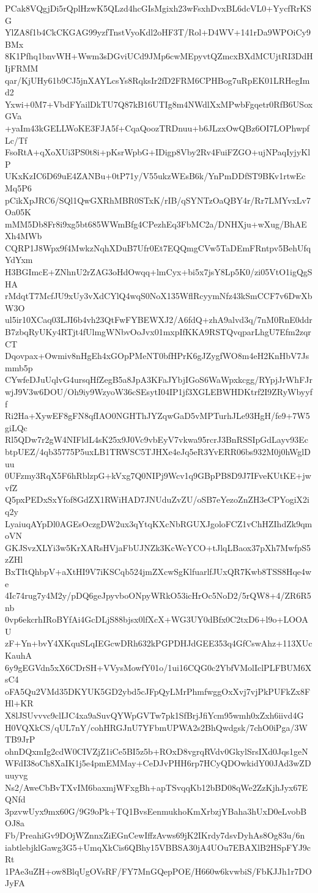 PCak8VQgjDi5rQplHzwK5QLzd4hcGIsMgixh23wFsxhDvxBL6dcVL0+YycfRrKSG
YlZA8f1b4CkCKGAG99yzfTnstVyoKdl2oHF3T/Rol+D4WV+141rDa9WPOiCy9BMx
8K1Pfhq1bnvWH+Wwm3sDGviUCd9JMp6cwMEpyvtQZmcxBXdMCUjtRI3DdHIjFRMM
qar/KjUHy61b9CJ5jnXAYLcsYs8RqksIr2fD2FRM6CPHBog7uRpEK01LRHegImd2
Yxwi+0M7+VbdFYailDkTU7Q87kB16UTIg8m4NWdlXxMPwbFgqetr0RfB6USoxGVa
+yaIm43kGELLWoKE3FJA5f+CqaQoozTRDnuu+b6JLzxOwQBz6OI7LOPhwpfLc/Tf
FsoRtA+qXoXUi3PS0t8i+pKsrWpbG+IDigp8Vby2Rv4FuiFZGO+ujNPaqIyjyKlP
UKxKzIC6D69uE4ZANBu+0tP71y/V55ukzWEsB6k/YnPmDDfST9BKv1rtwEcMq5P6
pCikXpJRC6/SQl1QwGXRhMBR0STxK/rIB/qSYNTzOaQBY4r/Rr7LMYvxLv7Oa05K
mMM5Db8Fr8i9xg5bt685WWmBfg4CPezhEq3FbMC2a/DNHXju+wXug/BhAEXh4MWb
CQRP1J8Wpx9f4MwkzNqhXDuB7Ufr0Et7EQQmgCVw5TaDEmFRntpv5BehUfqYdYxm
H3BGImcE+ZNhnU2rZAG3oHdOwqq+lmCyx+bi5x7jsY8Lp5K0/zi05VtO1igQgSHA
rMdqtT7McfJU9xUy3vXdCYlQ4wqS0NoX135WflRcyymNfz43kSmCCF7v6DwXbW3O
ul5ir10XCaq03LJI6b4vh23QtFwFYBEWXJ2/A6fdQ+zhA9alvd3q/7nM0RnE0ddr
B7zbqRyUKy4RTjt4fUlmgWNbvOoJvx01mxpIfKKA9RSTQvqparLhgU7Efm2zqrCT
Dqovpax+Owmiv8nHgEh4xGOpPMeNT0bfHPrK6gJZygfWO8m4eH2KnHbV7Jsmmb5p
CYwfeDJuUqlvG4ursqHfZegB5a8JpA3KFaJYbjIGoS6WaWpxkcgg/RYpjJrWhFJr
wjJ9V3w6DOU/Oh9iy9WzyoW36cSEsytI04IP1jf3XGLEBWHDKtrf2I9ZRyWbyyff
Ri2Ha+XywEF8gFN8qfIAO0NGHThJYZqwGaD5vMPTurhJLe93HgH/fe9+7W5giLQc
Rl5QDw7r2gW4NIFldL4sK25x9J0Vc9vbEyV7vkwa95rcrJ3BnRSSIpGdLayv93Ec
btpUEZ/4qb35775P5uxLB1TRWSC5TJHXe4eJq5eR3YvERR06bs932M0j0hWglDuu
0UFzmy3RqX5F6hRblzpG+kVxg7Q0NIPj9Wcv1q9GBpPB8D9J7IFveKUtKE+jwvfZ
Q5pxPEDxSxYfof8GdZX1RWiHAD7JNUduZvZU/oSB7eYezoZnZH3eCPYogiX2iq2y
LyaiuqAYpDl0AGEsOczgDW2ux3qYtqKXcNbRGUXJgoloFCZ1vChHZIhdZk9qmoVN
GKJSvzXLYi3w5KrXARsHVjaFbUJNZk3KcWcYCO+tJlqLBaox37pXh7MwfpS5zZHl
BxTItQhbpV+aXtHI9V7iKSCqb524jmZXcwSgKlfuarlfJUxQR7Kwb8TSS8Hqe4we
4Ic74rug7y4M2y/pDQ6geJpyvboONpyWRkO53icHrOc5NoD2/5rQW8+4/ZR6R5nb
0vp6ekcrhIRoBYfAi4GcDLjS88bjsx0lfXcX+WG3UY0dBfx0C2txD6+l9o+LOOAU
zF+Yn+bvY4XKquSLqIEGcwDRh632kPGPDHJdGEE353q4GfCswAhz+113XUcKauhA
6y9gEGVdn5xX6CDrSH+VVysMowfY01o/1ui16CQG0c2YbfVMolIclPLFBUM6XsC4
oFA5Qu2VMd35DKYUK5GD2ybd5cJFpQyLMrPhmfwggOxXvj7vjPkPUFkZx8FHl+KR
X8lJSUvvvc9clIJC4xa9aSuvQYWpGVTw7pk1SfBrjJfiYcm95wmh0xZxh6iivd4G
H0VQXkCS/qUL7nY/cohHRGJnU7YFbmUPWA2s2BhQwdgsk/7chO0iPga/3WTB9JrP
ohnDQxmIg2cdW0CIVZjZ1iCe5BI5z5b+ROxD8vgrqRVdv0GkylSrsIXd0Jqs1geN
WFdI38oCh8XaIK1j5e4pmEMMay+CeDJvPHH6rp7HCyQDOwkidY00JAd3wZDuuyvg
Ns2/AweCbBvTXvIM6baxmjWFxgBh+apTSvqqKb12bBD08qWe2ZzKjhJyx67EQNfd
3pzvwUyx9mx60G/9G9oPk+TQ1BvsEenmukhoKmXrbzjYBaha3hUxD0eLvobBOJ8a
Fb/PreahiGv9DOjWZnnxZiEGnCewIffzAvws69jK2IKrdy7dsvDyhAs8Og83u/6n
iabtlebjklGawg3G5+UmqXkCis6QBhy15VBBSA30jA4UOu7EBAXlB2HSpFYJ9cRt
1PAe3uZH+ow8BlqUgOVsRF/FY7MnGQepPOE/H660w6kvwbiS/FbKJJh1r7DOJyFA
